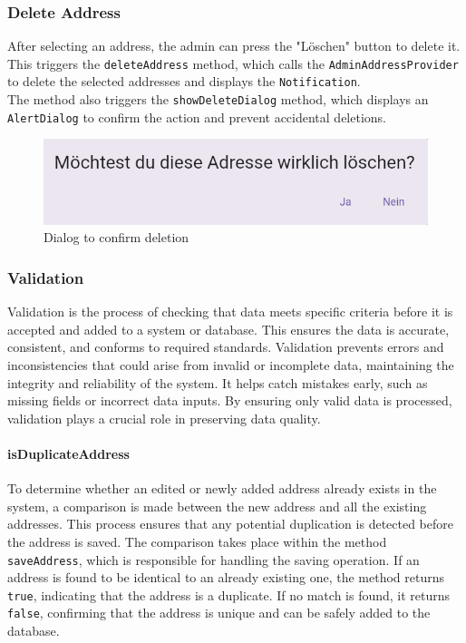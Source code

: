 \subsubsection{Delete Address}
After selecting an address, the admin can press the "Löschen" button to delete it. This triggers the \texttt{deleteAddress} method, which calls the \texttt{AdminAddressProvider} to delete the selected addresses and displays the \texttt{Notification}.\\

The method also triggers the \texttt{showDeleteDialog} method, which displays an \texttt{AlertDialog} to confirm the action and prevent accidental deletions.

\begin{figure}[H]
    \centering
    \includegraphics[width=0.6\linewidth]{images/AdminPanel/DeleteDialog.png}
    \caption{Dialog to confirm deletion}
\end{figure}
\newpage

\subsubsection{Validation}
\label{fig:Validation}
    Validation is the process of checking that data meets specific criteria before it is accepted and added to a system or database. This ensures the data is accurate, consistent, and conforms to required standards. Validation prevents errors and inconsistencies that could arise from invalid or incomplete data, maintaining the integrity and reliability of the system. It helps catch mistakes early, such as missing fields or incorrect data inputs. By ensuring only valid data is processed, validation plays a crucial role in preserving data quality. \autocite{ContributorstoWikimediaprojects2025Feb}

\paragraph{isDuplicateAddress}
    To determine whether an edited or newly added address already exists in the system, a comparison is made between the new address and all the existing addresses. This process ensures that any potential duplication is detected before the address is saved. The comparison takes place within the method \texttt{saveAddress}, which is responsible for handling the saving operation. If an address is found to be identical to an already existing one, the method returns \texttt{true}, indicating that the address is a duplicate. If no match is found, it returns \texttt{false}, confirming that the address is unique and can be safely added to the database.\\

